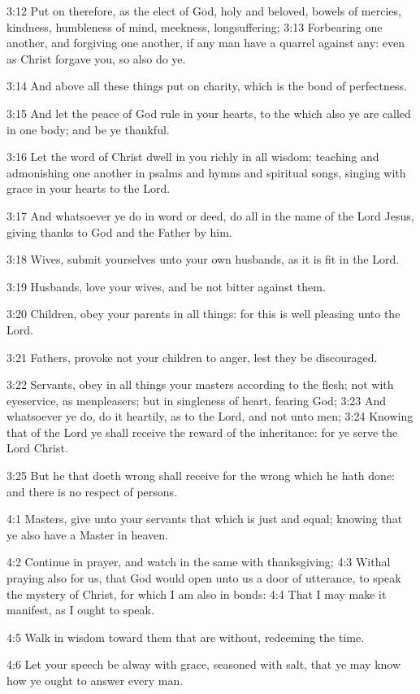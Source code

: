 3:12 Put on therefore, as the elect of God, holy and beloved, bowels of mercies, kindness, humbleness of mind, meekness, longsuffering; 3:13 Forbearing one another, and forgiving one another, if any man have a quarrel against any: even as Christ forgave you, so also do ye.

3:14 And above all these things put on charity, which is the bond of perfectness.

3:15 And let the peace of God rule in your hearts, to the which also ye are called in one body; and be ye thankful.

3:16 Let the word of Christ dwell in you richly in all wisdom; teaching and admonishing one another in psalms and hymns and spiritual songs, singing with grace in your hearts to the Lord.

3:17 And whatsoever ye do in word or deed, do all in the name of the Lord Jesus, giving thanks to God and the Father by him.

3:18 Wives, submit yourselves unto your own husbands, as it is fit in the Lord.

3:19 Husbands, love your wives, and be not bitter against them.

3:20 Children, obey your parents in all things: for this is well pleasing unto the Lord.

3:21 Fathers, provoke not your children to anger, lest they be discouraged.

3:22 Servants, obey in all things your masters according to the flesh; not with eyeservice, as menpleasers; but in singleness of heart, fearing God; 3:23 And whatsoever ye do, do it heartily, as to the Lord, and not unto men; 3:24 Knowing that of the Lord ye shall receive the reward of the inheritance: for ye serve the Lord Christ.

3:25 But he that doeth wrong shall receive for the wrong which he hath done: and there is no respect of persons.

4:1 Masters, give unto your servants that which is just and equal; knowing that ye also have a Master in heaven.

4:2 Continue in prayer, and watch in the same with thanksgiving; 4:3 Withal praying also for us, that God would open unto us a door of utterance, to speak the mystery of Christ, for which I am also in bonds: 4:4 That I may make it manifest, as I ought to speak.

4:5 Walk in wisdom toward them that are without, redeeming the time.

4:6 Let your speech be alway with grace, seasoned with salt, that ye may know how ye ought to answer every man.

